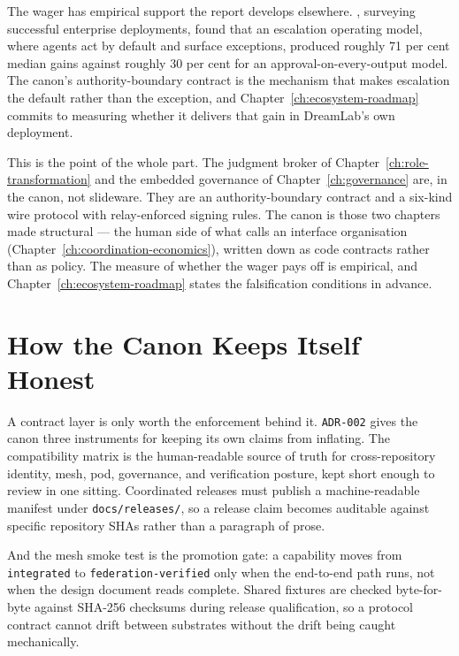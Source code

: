 The wager has empirical support the report develops elsewhere. \textcite{Pereira2026Playbook}, surveying successful enterprise deployments, found that an escalation operating model, where agents act by default and surface exceptions, produced roughly 71 per cent median gains against roughly 30 per cent for an approval-on-every-output model. The canon's authority-boundary contract is the mechanism that makes escalation the default rather than the exception, and Chapter~\ref{ch:ecosystem-roadmap} commits to measuring whether it delivers that gain in DreamLab's own deployment.

This is the point of the whole part. The judgment broker of Chapter~\ref{ch:role-transformation} and the embedded governance of Chapter~\ref{ch:governance} are, in the canon, not slideware. They are an authority-boundary contract and a six-kind wire protocol with relay-enforced signing rules. The canon is those two chapters made structural --- the human side of what \textcite{Liu2026} calls an interface organisation (Chapter~\ref{ch:coordination-economics}), written down as code contracts rather than as policy. The measure of whether the wager pays off is empirical, and Chapter~\ref{ch:ecosystem-roadmap} states the falsification conditions in advance.

\section{How the Canon Keeps Itself Honest}

A contract layer is only worth the enforcement behind it. \texttt{ADR-002} gives the canon three instruments for keeping its own claims from inflating. The compatibility matrix is the human-readable source of truth for cross-repository identity, mesh, pod, governance, and verification posture, kept short enough to review in one sitting. Coordinated releases must publish a machine-readable manifest under \texttt{docs/releases/}, so a release claim becomes auditable against specific repository SHAs rather than a paragraph of prose.

And the mesh smoke test is the promotion gate: a capability moves from \texttt{integrated} to \texttt{federation-verified} only when the end-to-end path runs, not when the design document reads complete. Shared fixtures are checked byte-for-byte against SHA-256 checksums during release qualification, so a protocol contract cannot drift between substrates without the drift being caught mechanically.

